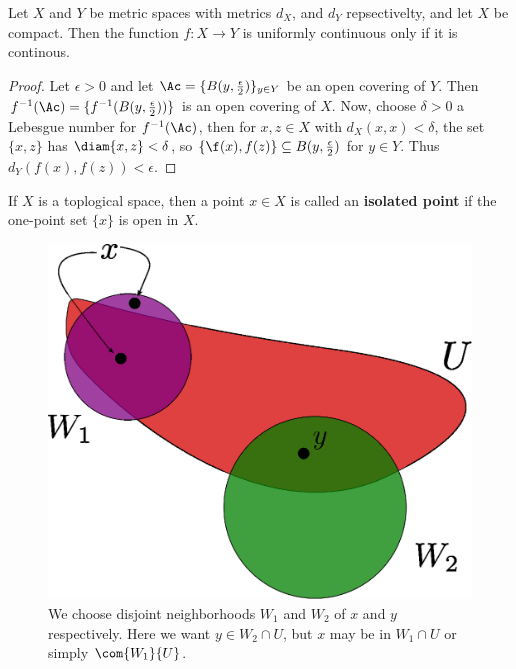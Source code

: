 \begin{theorem}\label{3.6.6}
    Let $X$ and  $Y$ be metric spaces with metrics $d_X$, and  $d_Y$
    repsectivelty, and let $X$ be compact. Then the function
    $f:X \rightarrow Y$ is uniformly continuous only if it is continous.
\end{theorem}
\begin{proof}
    Let $\epsilon>0$ and let  $\Ac=\{B(y,\frac{\epsilon}{2})\}_{y \in Y}$ be an
    open covering of $Y$. Then  $f^{-1}(\Ac)=\{f^{-1}(B(y,\frac{\epsilon}{2}))\}$
    is an open covering of $X$. Now, choose $\delta>0$ a Lebesgue number for
    $f^{-1}(\Ac)$, then for $x,z \in X$ with  $d_X(x,x)<\delta$, the set
    $\{x,z\}$ has $\diam\{x,z\}<\delta$, so $\{\f(x),f(z)\} \subseteq
    B(y,\frac{\epsilon}{2})$ for $y \in Y$. Thus  $d_Y(f(x),f(z))<\epsilon$.
\end{proof}

\begin{definition}
    If $X$ is a toplogical space, then a point $x \in X$ is called an
    \textbf{isolated point} if the one-point set $\{x\}$ is open in $X$.
\end{definition}

\begin{figure}[h]
    \centering
    \includegraphics[scale=0.5]{Figures/chapter3/thm3_6_7.eps}
    \caption{We choose disjoint neighborhoods $W_1$ and  $W_2$ of $x$ and  $y$
    respectively. Here we want  $y \in W_2 \cap U$, but  $x$ may be in  $W_1
\cap U$ or simply $\com{W_1}{U}$.}
    \label{fig_3.4}
\end{figure}

